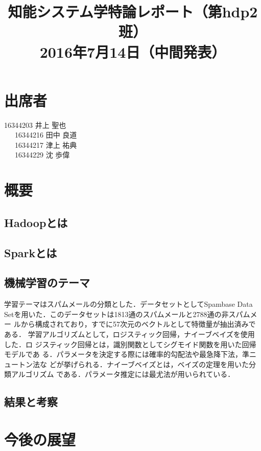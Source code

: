 \documentclass[a4paper,12pt]{jarticle}
\begin{document}
%
\title{\vspace{-30mm}知能システム学特論レポート（第hdp2班）\\ 2016年7月14日（中間発表）}
\date{}
%
%
\maketitle
%
\vspace{-30mm}
%
\section{出席者}
16344203 井上 聖也\\
~~~16344216 田中 良道\\
~~~16344217 津上 祐典\\
~~~16344229 沈 歩偉
\section{概要}

\subsection{Hadoopとは}

\subsection{Sparkとは}

\subsection{機械学習のテーマ}
学習テーマはスパムメールの分類とした．データセットとしてSpambase Data
Setを用いた．このデータセットは1813通のスパムメールと2788通の非スパムメー
ルから構成されており，すでに57次元のベクトルとして特徴量が抽出済みである．
学習アルゴリズムとして，ロジスティック回帰，ナイーブベイズを使用した．ロ
ジスティック回帰とは，識別関数としてシグモイド関数を用いた回帰モデルであ
る．パラメータを決定する際には確率的勾配法や最急降下法，準ニュートン法な
どが挙げられる．ナイーブベイズとは，ベイズの定理を用いた分類アルゴリズム
である．パラメータ推定には最尤法が用いられている．


\subsection{結果と考察}

\section{今後の展望}
\end{document}
